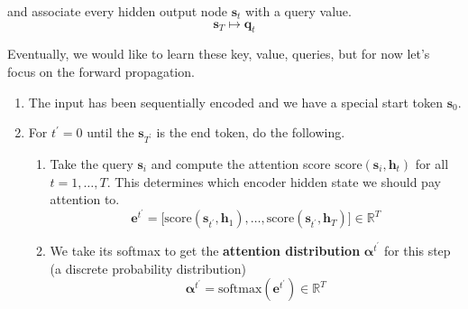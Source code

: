   and associate every hidden output node $\mathbf{s}_t$ with a query value. 
  \begin{equation}
    \mathbf{s}_T \mapsto \mathbf{q}_t
  \end{equation}

  \begin{definition}
    \label{def:seq2seq-with-vanilla-attention}
 
    Eventually, we would like to learn these key, value, queries, but for now let's focus on the forward propagation. 
    \begin{enumerate}
      \item The input has been sequentially encoded and we have a special start token $\mathbf{s}_0$. 
      \item For $t^\prime = 0$ until the $\mathbf{s}_{T^\prime}$ is the end token, do the following. 
      \begin{enumerate}
        \item Take the query $\mathbf{s}_i$ and compute the attention score $\mathrm{score}(\mathbf{s}_i, \mathbf{h}_t)$ for all $t = 1, \ldots, T$. This determines which encoder hidden state we should pay attention to. 
        \begin{equation}
          \mathbf{e}^{t^\prime} = \big[ \mathrm{score}(\mathbf{s}_{t^\prime}, \mathbf{h}_1 ), \ldots, \mathrm{score}(\mathbf{s}_{t^\prime}, \mathbf{h}_T) \big] \in \mathbb{R}^T
        \end{equation}

        \item We take its softmax to get the \textbf{attention distribution} $\boldsymbol{\alpha}^{t^\prime}$ for this step (a discrete probability distribution) 
        \begin{equation}
          \boldsymbol{\alpha}^{t^\prime} = \mathrm{softmax} (\mathbf{e}^{t^\prime}) \in \mathbb{R}^T
        \end{equation}


\end{enumerate}
\end{enumerate}
\end{definition}
